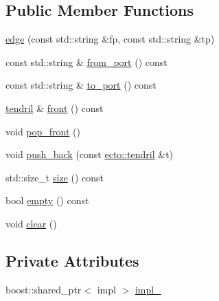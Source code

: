 \subsection*{\-Public \-Member \-Functions}
\begin{DoxyCompactItemize}
\item 
\hyperlink{structecto_1_1graph_1_1edge_a8006b69871f55450b8acec6ac05762d4}{edge} (const std\-::string \&fp, const std\-::string \&tp)
\item 
const std\-::string \& \hyperlink{structecto_1_1graph_1_1edge_a2fb1c33fc4d337b719a1666eab943da5}{from\-\_\-port} () const 
\item 
const std\-::string \& \hyperlink{structecto_1_1graph_1_1edge_ab1c782c9d14a3f58504783747e14f7e0}{to\-\_\-port} () const 
\item 
\hyperlink{classecto_1_1tendril}{tendril} \& \hyperlink{structecto_1_1graph_1_1edge_ac2cd2d873aa55199e44f836ffada307e}{front} () const 
\item 
void \hyperlink{structecto_1_1graph_1_1edge_a0b530770694143bc00bc6c563b64a3c9}{pop\-\_\-front} ()
\item 
void \hyperlink{structecto_1_1graph_1_1edge_a257de20468c8c1b6c606448ba39c493c}{push\-\_\-back} (const \hyperlink{classecto_1_1tendril}{ecto\-::tendril} \&t)
\item 
std\-::size\-\_\-t \hyperlink{structecto_1_1graph_1_1edge_a539c89ca50c781c95ece29f7cade4d1d}{size} () const 
\item 
bool \hyperlink{structecto_1_1graph_1_1edge_ab8857a18a55e6d230e84a2a07242d67e}{empty} () const 
\item 
void \hyperlink{structecto_1_1graph_1_1edge_a2761342510ae1bedb1c91bbbda5f46ef}{clear} ()
\end{DoxyCompactItemize}
\subsection*{\-Private \-Attributes}
\begin{DoxyCompactItemize}
\item 
boost\-::shared\-\_\-ptr$<$ impl $>$ \hyperlink{structecto_1_1graph_1_1edge_a88b7d991f162cd009884c3061da8169d}{impl\-\_\-}
\end{DoxyCompactItemize}



